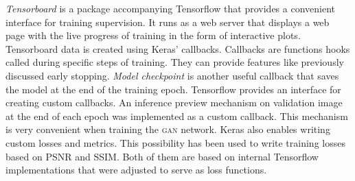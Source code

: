 \textit{Tensorboard} is a package accompanying Tensorflow that provides a convenient interface for training supervision.
It runs as a web server that displays a web page with the live progress of training in the form of interactive plots.
Tensorboard data is created using Keras' callbacks.
Callbacks are functions hooks called during specific steps of training.
They can provide features like previously discussed early stopping.
\textit{Model checkpoint} is another useful callback that saves the model at the end of the training epoch.
Tensorflow provides an interface for creating custom callbacks.
An inference preview mechanism on validation image at the end of each epoch was implemented as a custom callback.
This mechanism is very convenient when training the \textsc{gan} network.
Keras also enables writing custom losses and metrics.
This possibility has been used to write training losses based on PSNR and SSIM.
Both of them are based on internal Tensorflow implementations that were adjusted to serve as loss functions.
